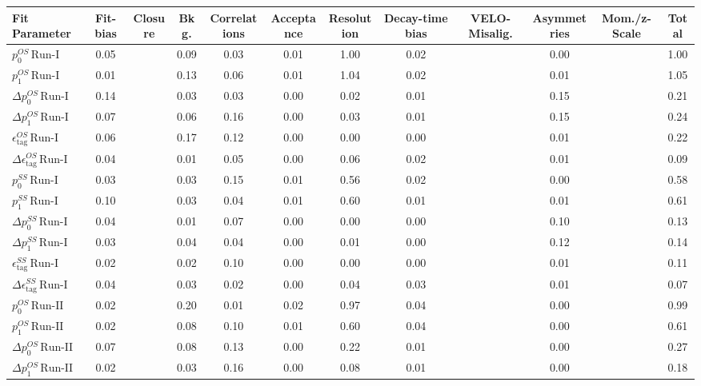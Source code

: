 \begin{tabular}{l  c  c  c  c  c  c  c  c  c  c  | c }
\hline
\hline
Fit Parameter & Fit-bias & Closure & Bkg. & Correlations & Acceptance & Resolution & Decay-time bias & VELO-Misalig. & Asymmetries & Mom./z-Scale &  Total  \\ 
\hline
$p_{0}^{OS} \, \text{Run-I}$ & 0.05 &  & 0.09 & 0.03 & 0.01 & 1.00 & 0.02 &  & 0.00 &  & 1.00 \\ 
$p_{1}^{OS} \, \text{Run-I}$ & 0.01 &  & 0.13 & 0.06 & 0.01 & 1.04 & 0.02 &  & 0.01 &  & 1.05 \\ 
$\Delta p_{0}^{OS} \, \text{Run-I}$ & 0.14 &  & 0.03 & 0.03 & 0.00 & 0.02 & 0.01 &  & 0.15 &  & 0.21 \\ 
$\Delta p_{1}^{OS} \, \text{Run-I}$ & 0.07 &  & 0.06 & 0.16 & 0.00 & 0.03 & 0.01 &  & 0.15 &  & 0.24 \\ 
$\epsilon_{\text{tag}}^{OS} \, \text{Run-I}$ & 0.06 &  & 0.17 & 0.12 & 0.00 & 0.00 & 0.00 &  & 0.01 &  & 0.22 \\ 
$\Delta \epsilon_{\text{tag}}^{OS} \, \text{Run-I}$ & 0.04 &  & 0.01 & 0.05 & 0.00 & 0.06 & 0.02 &  & 0.01 &  & 0.09 \\ 
$p_{0}^{SS} \, \text{Run-I}$ & 0.03 &  & 0.03 & 0.15 & 0.01 & 0.56 & 0.02 &  & 0.00 &  & 0.58 \\ 
$p_{1}^{SS} \, \text{Run-I}$ & 0.10 &  & 0.03 & 0.04 & 0.01 & 0.60 & 0.01 &  & 0.01 &  & 0.61 \\ 
$\Delta p_{0}^{SS} \, \text{Run-I}$ & 0.04 &  & 0.01 & 0.07 & 0.00 & 0.00 & 0.00 &  & 0.10 &  & 0.13 \\ 
$\Delta p_{1}^{SS} \, \text{Run-I}$ & 0.03 &  & 0.04 & 0.04 & 0.00 & 0.01 & 0.00 &  & 0.12 &  & 0.14 \\ 
$\epsilon_{\text{tag}}^{SS} \, \text{Run-I}$ & 0.02 &  & 0.02 & 0.10 & 0.00 & 0.00 & 0.00 &  & 0.01 &  & 0.11 \\ 
$\Delta \epsilon_{\text{tag}}^{SS} \, \text{Run-I}$ & 0.04 &  & 0.03 & 0.02 & 0.00 & 0.04 & 0.03 &  & 0.01 &  & 0.07 \\ 
$p_{0}^{OS} \, \text{Run-II}$ & 0.02 &  & 0.20 & 0.01 & 0.02 & 0.97 & 0.04 &  & 0.00 &  & 0.99 \\ 
$p_{1}^{OS} \, \text{Run-II}$ & 0.02 &  & 0.08 & 0.10 & 0.01 & 0.60 & 0.04 &  & 0.00 &  & 0.61 \\ 
$\Delta p_{0}^{OS} \, \text{Run-II}$ & 0.07 &  & 0.08 & 0.13 & 0.00 & 0.22 & 0.01 &  & 0.00 &  & 0.27 \\ 
$\Delta p_{1}^{OS} \, \text{Run-II}$ & 0.02 &  & 0.03 & 0.16 & 0.00 & 0.08 & 0.01 &  & 0.00 &  & 0.18 \\ 

\end{tabular}
